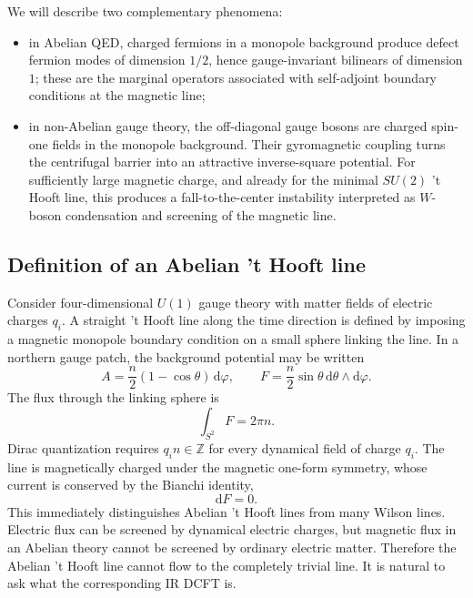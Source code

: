\documentclass[11pt]{article}
\newcommand{\Z}{\mathbb{Z}}
\newcommand{\dd}{\mathrm{d}}
\begin{document}
We will describe two complementary phenomena:
\begin{itemize}
  \item in Abelian QED, charged fermions in a monopole background produce defect fermion modes of dimension $1/2$, hence gauge-invariant bilinears of dimension $1$; these are the marginal operators associated with self-adjoint boundary conditions at the magnetic line;
  \item in non-Abelian gauge theory, the off-diagonal gauge bosons are charged spin-one fields in the monopole background.  Their gyromagnetic coupling turns the centrifugal barrier into an attractive inverse-square potential.  For sufficiently large magnetic charge, and already for the minimal $SU(2)$ 't Hooft line, this produces a fall-to-the-center instability interpreted as $W$-boson condensation and screening of the magnetic line.
\end{itemize}

\subsection{Definition of an Abelian 't Hooft line}

Consider four-dimensional $U(1)$ gauge theory with matter fields of electric charges $q_i$.  A straight 't Hooft line along the time direction is defined by imposing a magnetic monopole boundary condition on a small sphere linking the line.  In a northern gauge patch, the background potential may be written
\begin{equation}
  A=\frac{n}{2}(1-\cos\theta)\,\dd\varphi,
  \qquad
  F=\frac{n}{2}\sin\theta\,\dd\theta\wedge\dd\varphi .
  \label{eq:thooftlinebackground}
\end{equation}
The flux through the linking sphere is
\begin{equation}
  \int_{S^2}F=2\pi n .
\end{equation}
Dirac quantization requires $q_i n\in\Z$ for every dynamical field of charge $q_i$.  The line is magnetically charged under the magnetic one-form symmetry, whose current is conserved by the Bianchi identity,
\begin{equation}
  \dd F=0 .
\end{equation}
This immediately distinguishes Abelian 't Hooft lines from many Wilson lines.  Electric flux can be screened by dynamical electric charges, but magnetic flux in an Abelian theory cannot be screened by ordinary electric matter.  Therefore the Abelian 't Hooft line cannot flow to the completely trivial line.  It is natural to ask what the corresponding IR DCFT is.
\end{document}
